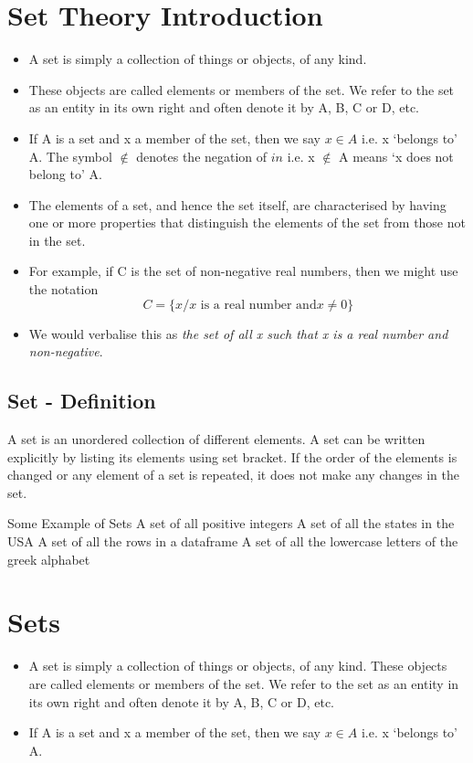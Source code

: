 \documentclass[11pt,a4paper,titlepage,oneside,openany]{article}
\numberwithin{equation}{section}
\numberwithin{algorithm}{section}
\numberwithin{figure}{section}
\numberwithin{table}{section}
\begin{document}
\section{Set Theory Introduction}


\begin{itemize}
\item A set is simply a collection of things or objects, of any kind. 
\item These objects
are called elements or members of the set. We refer to the set as an
entity in its own right and often denote it by A, B, C or D, etc.
\item 
If A is a set and x a member of the set, then we say $x \in A$ i.e. x ‘belongs to’
A. The symbol $\notin$ denotes the negation of $in$  i.e. x $\notin$ A means ‘x does not
belong to’ A.
\end{itemize}

\begin{itemize}
\item The elements of a set, and hence the set itself, are characterised by having
one or more properties that distinguish the elements of the set from those
not in the set. 
\item For example, if C is the set of non-negative real numbers, then we
might use the notation
\[C = \{x / x \mbox{ is a real number and} x \neq 0\}\]
\item We would verbalise this as \textit{the set of all x such that x is a real number and non-negative}.
\end{itemize}


\subsection{Set - Definition}
A set is an unordered collection of different elements. A set can be written explicitly by listing its elements using set bracket. If the order of the elements is changed or any element of a set is repeated, it does not make any changes in the set.

Some Example of Sets
A set of all positive integers
A set of all the states in the USA
A set of all the rows in a dataframe
A set of all the lowercase letters of the greek alphabet\section{Sets}
\smallskip   %

\begin{itemize}
\item A set is simply a collection of things or objects, of any kind. These objects
are called elements or members of the set. We refer to the set as an
entity in its own right and often denote it by A, B, C or D, etc.
\item If A is a set and x a member of the set, then we say $x \in A$ i.e. x ‘belongs to’
A. 
\end{itemize}
\smallskip 
\end{document}
